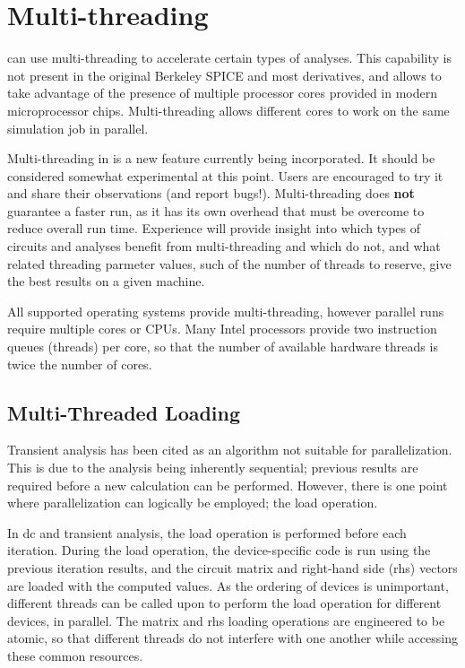 \section{Multi-threading}
\label{threads}


{\WRspice} can use multi-threading to accelerate certain types of
analyses.  This capability is not present in the original Berkeley
SPICE and most derivatives, and allows {\WRspice} to take advantage of
the presence of multiple processor cores provided in modern
microprocessor chips.  Multi-threading allows different cores to work
on the same simulation job in parallel.

Multi-threading in {\WRspice} is a new feature currently being
incorporated.  It should be considered somewhat experimental at this
point.  Users are encouraged to try it and share their observations
(and report bugs!).  Multi-threading does {\bf not} guarantee a faster
run, as it has its own overhead that must be overcome to reduce
overall run time.  Experience will provide insight into which types of
circuits and analyses benefit from multi-threading and which do not,
and what related threading parmeter values, such of the number of
threads to reserve, give the best results on a given machine.

All supported operating systems provide multi-threading, however
parallel runs require multiple cores or CPUs.  Many Intel processors
provide two instruction queues (threads) per core, so that the number
of available hardware threads is twice the number of cores.

\subsection{Multi-Threaded Loading}

Transient analysis has been cited as an algorithm not suitable for
parallelization.  This is due to the analysis being inherently
sequential; previous results are required before a new calculation can
be performed.  However, there is one point where parallelization can
logically be employed; the load operation.

In dc and transient analysis, the load operation is performed before
each iteration.  During the load operation, the device-specific code
is run using the previous iteration results, and the circuit matrix
and right-hand side (rhs) vectors are loaded with the computed values. 
As the ordering of devices is unimportant, different threads can be
called upon to perform the load operation for different devices, in
parallel.  The matrix and rhs loading operations are engineered to be
atomic, so that different threads do not interfere with one another
while accessing these common resources.

